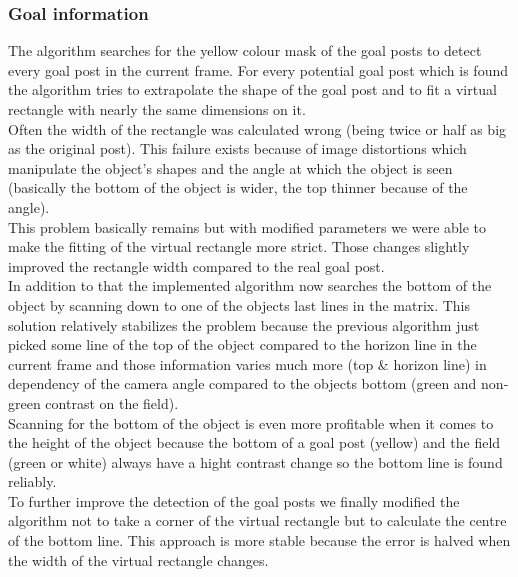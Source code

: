 \documentclass[lnicst,a4paper]{svmultln}
\begin{document}
\subsubsection{Goal information}
The algorithm searches for the yellow colour mask of the goal posts to detect every goal post in the current frame. For every potential goal post which is found the algorithm tries to extrapolate the shape of the goal post and to fit a virtual rectangle with nearly the same dimensions on it.
\\
Often the width of the rectangle was calculated wrong (being twice or half as big as the original post). This failure exists because of image distortions which manipulate the object's shapes and the angle at which the object is seen (basically the bottom of the object is wider, the top thinner because of the angle).
\\
This problem basically remains but with modified parameters we were able to make the fitting of the virtual rectangle more strict. Those changes slightly improved the rectangle width compared to the real goal post.
\\
In addition to that the implemented algorithm now searches the bottom of the object by scanning down to one of the objects last lines in the matrix. This solution relatively stabilizes the problem because the previous algorithm just picked some line of the top of the object compared to the horizon line in the current frame and those information varies much more (top \& horizon line) in dependency of the camera angle compared to the objects bottom (green and non-green contrast on the field).
\\
Scanning for the bottom of the object is even more profitable when it comes to the height of the object because the bottom of a goal post (yellow) and the field (green or white) always have a hight contrast change so the bottom line is found reliably.
\\
To further improve the detection of the goal posts we finally modified the algorithm not to take a corner of the virtual rectangle but to calculate the centre of the bottom line. This approach is more stable because the error is halved when the width of the virtual rectangle changes.
\end{document}

